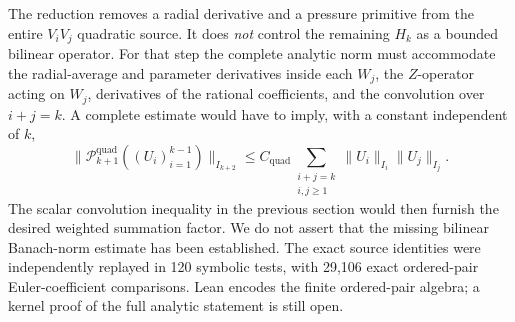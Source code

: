 The reduction removes a radial derivative and a pressure primitive
from the entire $V_iV_j$ quadratic source. It does \emph{not}
control the remaining $H_k$ as a bounded bilinear operator.
For that step the complete analytic norm must accommodate the
radial-average and parameter derivatives inside each $W_j$,
the $Z$-operator acting on $W_j$, derivatives of the rational
coefficients, and the convolution over $i+j=k$. A complete estimate
would have to imply, with a constant independent of $k$,
\[
 \bigl\|\mathcal P_{k+1}^{\mathrm{quad}}((U_i)_{i=1}^{k-1})\bigr\|_{I_{k+2}}
 \le C_{\mathrm{quad}}\sum_{\substack{i+j=k\\i,j\ge1}}
   \|U_i\|_{I_i}\|U_j\|_{I_j}.
\]
The scalar convolution inequality in the previous section would
then furnish the desired weighted summation factor.
We do not assert that the missing bilinear Banach-norm estimate
has been established. The exact source identities were independently
replayed in 120 symbolic tests, with 29,106 exact ordered-pair
Euler-coefficient comparisons. Lean encodes the finite ordered-pair
algebra; a kernel proof of the full analytic statement is still open.
